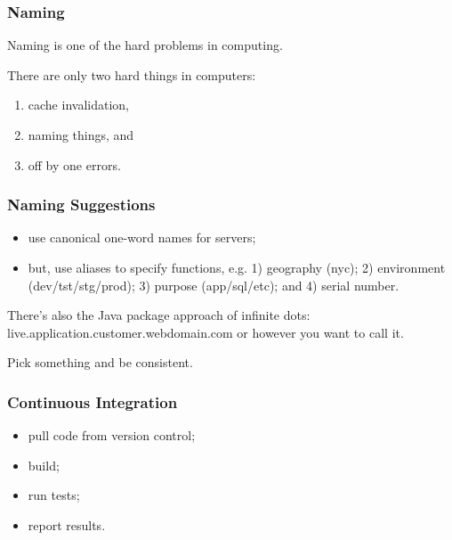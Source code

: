 \begin{frame}
\frametitle{Naming}

\Large
\begin{changemargin}{1cm}
Naming is one of the hard problems in computing. 

There are only two hard things in computers:
\begin{enumerate}
\item cache invalidation,
\item naming things, and
\item off by one errors.
\end{enumerate}
\end{changemargin}
\end{frame}



\begin{frame}
\frametitle{Naming Suggestions}

\large
\begin{changemargin}{1cm}
\begin{itemize}
\item use canonical one-word names for servers;
\item but, use aliases to specify functions, e.g. 1) geography (nyc); 2) environment (dev/tst/stg/prod); 
3) purpose (app/sql/etc); and 4) serial number.
\end{itemize}


There's also the Java package approach of infinite dots: live.application.customer.webdomain.com or however you want to call it. 

Pick something and be consistent.
\end{changemargin}
\end{frame}



\begin{frame}
\frametitle{Continuous Integration}

\Large
\begin{changemargin}{1cm}
\begin{itemize}
\item pull code from version control;
\item build;
\item run tests;
\item report results.
\end{itemize}

\end{changemargin}

\end{frame}

